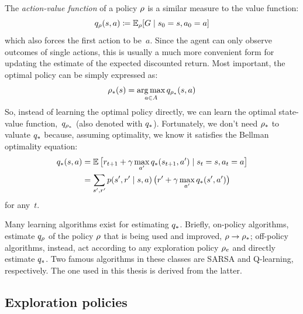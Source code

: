 The \emph{action-value function} of a policy $\rho$ is a similar measure to
the value function:
\begin{equation}
	q_{\rho}(s, a) \coloneqq \mathbb{E}_{\rho}[G \mid s_0 = s, a_0 = a]
\end{equation}
which also forces the first action to be~$a$. Since the agent can only observe
outcomes of single actions, this is usually a much more convenient form for
updating the estimate of the expected discounted return. Most important, the
optimal policy can be simply expressed as:
\begin{equation}
	{\rho}_*(s) = \operatorname*{arg\,max}_{a \in A} q_{{\rho}_*}(s, a)
	\label{eq:opt-policy-q}
\end{equation}
So, instead of learning the optimal policy directly, we can learn the optimal
state-value function,~$q_{{\rho}_*}$ (also denoted with ${q}_*$).
Fortunately, we don't need ${\rho}_*$ to valuate ${q}_*$ because,
assuming optimality, we know it satisfies the Bellman optimality equation:
\begin{align}
	{q}_*(s, a) &= \mathbb{E}\, \bigl[ r_{t+1} + \gamma \max_{a'}
	{q}_*(s_{t+1}, a') \mid s_t = s, a_t = a \bigr] \\
	&= \sum_{s', r'} p(s', r' \mid s, a) \,
	\bigl( r' + \gamma \max_{a'} {q}_*(s', a') \bigr)
	\label{eq:q-bellman}
\end{align}
for any~$t$.

Many learning algorithms exist for estimating ${q}_*$. Briefly, on-policy
algorithms, estimate $q_\rho$ of the policy $\rho$ that is being used
and improved, $\rho \to {\rho}_*$; off-policy algorithms, instead,
act according to any exploration policy $\rho_e$ and directly estimate
${q}_*$.  Two famous algorithms in these classes are SARSA and
Q-learning, respectively.  The one used in this thesis is derived from the
latter.


\subsection{Exploration policies}

\label{sec:exploration-policies}

